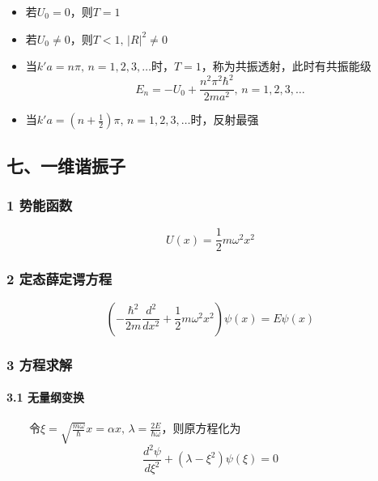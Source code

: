 \documentclass[UTF8,twocolumn]{ctexart}
\providecommand{\tightlist}{%
  \setlength{\itemsep}{0pt}\setlength{\parskip}{0pt}}
\let\oldparagraph\paragraph
\renewcommand{\paragraph}[1]{\oldparagraph{#1}\mbox{}}
\begin{document}
\begin{itemize}
\tightlist
\item
  若\(U_0=0\)，则\(T=1\)
\item
  若\(U_0\neq0\)，则\(T<1,\,|R|^2\neq0\)
\item
  当\(k'a=n\pi,\,n=1,2,3,\ldots\)时，\(T=1\)，称为共振透射，此时有共振能级
  \[
  E_n=-U_0+\frac{n^2\pi^2\hbar^2}{2ma^2},\,n=1,2,3,\ldots
  \]
\item
  当\(k'a=(n+\frac{1}{2})\pi,\,n=1,2,3,\ldots\)时，反射最强
\end{itemize}

\hypertarget{ux4e03ux4e00ux7ef4ux8c10ux632fux5b50}{%
\subsection{七、一维谐振子}\label{ux4e03ux4e00ux7ef4ux8c10ux632fux5b50}}

\hypertarget{ux52bfux80fdux51fdux6570-3}{%
\subsubsection{1 势能函数}\label{ux52bfux80fdux51fdux6570-3}}

\[
U(x)=\frac{1}{2}m\omega^2x^2
\]

\hypertarget{ux5b9aux6001ux859bux5b9aux8c14ux65b9ux7a0b-6}{%
\subsubsection{2
定态薛定谔方程}\label{ux5b9aux6001ux859bux5b9aux8c14ux65b9ux7a0b-6}}

\[
(-\frac{\hbar^2}{2m}\frac{d^2}{dx^2}+\frac{1}{2}m\omega^2x^2)\psi(x)=E\psi(x)
\]

\hypertarget{ux65b9ux7a0bux6c42ux89e3}{%
\subsubsection{3 方程求解}\label{ux65b9ux7a0bux6c42ux89e3}}

\hypertarget{ux65e0ux91cfux7eb2ux53d8ux6362}{%
\paragraph{{ }3.1 无量纲变换}\label{ux65e0ux91cfux7eb2ux53d8ux6362}}

  令\(\xi=\sqrt{\frac{m\omega}{\hbar}}x=\alpha x,\,\lambda=\frac{2E}{\hbar\omega}\)，则原方程化为
\[
\frac{d^2\psi}{d\xi^2}+(\lambda-\xi^2)\psi(\xi)=0
\]
\end{document}
